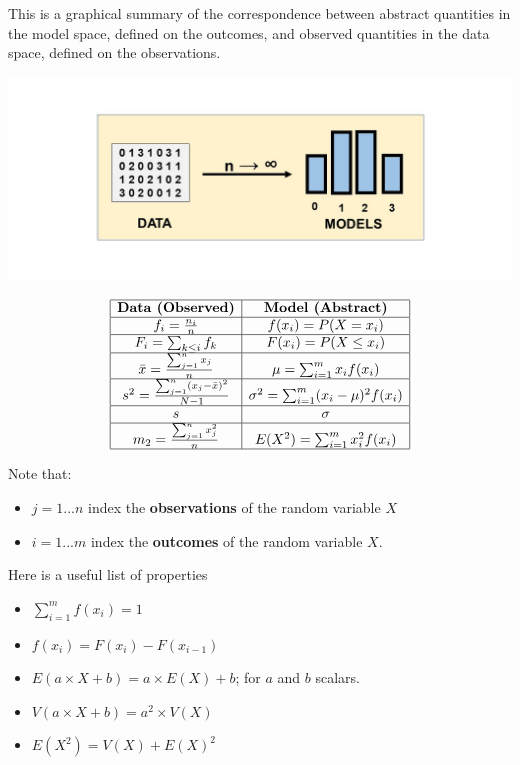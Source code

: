 \documentclass[
]{book}
\providecommand{\tightlist}{%
  \setlength{\itemsep}{0pt}\setlength{\parskip}{0pt}}
\begin{document}
This is a graphical summary of the correspondence between abstract quantities in the model space, defined on the outcomes, and observed quantities in the data space, defined on the observations.

\includegraphics{./figures/randomvarsum.JPG}

\[
\begin{array}{|c|c|}
\hline
 \textbf{Data (Observed)} & \textbf{Model (Abstract)}  \\ 
\hline
 f_i=\frac{n_i}{n} &  f(x_i)=P(X=x_i) \\ 
\hline
 F_i=\sum_{k \leq i} f_k &  F(x_i)=P(X \leq x_i) \\ 
\hline
  \bar{x}=\frac{\sum_{j=1}^n x_j}{n} & \mu= \sum_{i=1}^m x_i f(x_i)\\ 
\hline
 s^2=\frac{\sum_{j=1}^n (x_j-\bar{x})^2}{N-1} & \sigma^2=\sum_{i=1}^m (x_i-\mu)^2 f(x_i) \\ 
\hline
 s & \sigma \\ 
\hline
 m_2=\frac{\sum_{j=1}^n x_j^2}{n} & E(X^2)=\sum_{i=1}^m x_i^2 f(x_i)  \\ 
\hline
\end{array}
\]

Note that:

\begin{itemize}
\tightlist
\item
  \(j=1...n\) index the \textbf{observations} of the random variable \(X\)
\item
  \(i=1...m\) index the \textbf{outcomes} of the random variable \(X\).
\end{itemize}

Here is a useful list of properties

\begin{itemize}
\tightlist
\item
  \(\sum_{i=1}^m f(x_i)=1\)
\item
  \(f(x_i)=F(x_i)-F(x_{i-1})\)
\item
  \(E(a\times X +b)= a\times E(X) +b\); for \(a\) and \(b\) scalars.
\item
  \(V(a\times X +b)= a^2\times V(X)\)
\item
  \(E(X^2)=V(X)+E(X)^2\)
\end{itemize}
\end{document}

